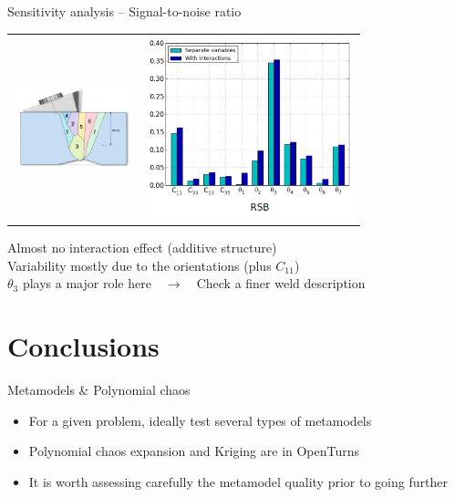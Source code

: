 \documentclass[9pt]{beamer}
\newcommand{\titx}{\usebeamercolor[fg]{subtitle}}
\begin{document}
\begin{frame}{Sensitivity analysis -- Signal-to-noise ratio}

    \small
    \begin{center}
      \begin{tabular}{m{3.5cm}m{6.0cm}}
        \includegraphics[width=3.5cm]{../Pics/cnd_config.jpg} & 
        \includegraphics[width=6.0cm]{../Pics/sobol_indices.jpg} \\
      \end{tabular}
        {\titx Almost no interaction effect (additive structure) \\
        Variability mostly due to the orientations (plus $C_{11}$) \\
        $\theta_3$ plays a major role here~~$\rightarrow$~~Check a finer weld 
        description}
    \end{center}

\end{frame}

\section{Conclusions}

\begin{frame}{Metamodels \& Polynomial chaos }

\begin{itemize}
\item For a given problem, ideally test several types of metamodels
\vspace{0.6cm}
\item Polynomial chaos expansion and Kriging are in OpenTurns
\vspace{0.6cm}
\item It is worth assessing carefully the metamodel quality prior to going further
\end{itemize}

\end{frame}
\end{document}
